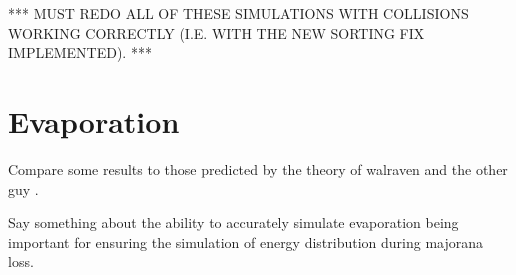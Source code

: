 *** MUST REDO ALL OF THESE SIMULATIONS WITH COLLISIONS WORKING CORRECTLY (I.E. WITH THE NEW SORTING FIX IMPLEMENTED). ***

\section{Evaporation} \label{sec:evaporation}

Compare some results to those predicted by the theory of walraven \cite{Walraven2010} and the other guy \cite{Luiten1996} . 

Say something about the ability to accurately simulate evaporation being important for ensuring the simulation of energy distribution during majorana loss.

